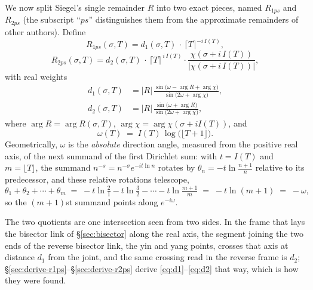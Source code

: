 \documentclass[11pt]{article}
\theoremstyle{definition}
\begin{document}
We now split Siegel's single remainder $R$ into two exact pieces, named
$R_{1ps}$ and $R_{2ps}$ (the subscript ``$ps$'' distinguishes them from the
approximate remainders of other authors). Define
\begin{equation}\label{eq:R1ps-def}
R_{1ps}(\sigma, T) = d_{1}(\sigma, T)\,\cdot\, \lceil T \rceil^{-i\,I(T)},
\end{equation}
\begin{equation}\label{eq:R2ps-def}
R_{2ps}(\sigma, T) = d_{2}(\sigma, T)\,\cdot\, \lceil T \rceil^{\,i\,I(T)}
\cdot \frac{\chi(\sigma + i\,I(T))}{|\chi(\sigma + i\,I(T))|},
\end{equation}
with real weights
\begin{align}
d_{1}(\sigma,T) &= |R|\,
\frac{\sin\!\bigl(\omega - \arg R + \arg\chi\bigr)}{\sin\!\bigl(2\omega + \arg\chi\bigr)},
\label{eq:d1}\\[4pt]
d_{2}(\sigma,T) &= |R|\,
\frac{\sin\!\bigl(\omega + \arg R\bigr)}{\sin\!\bigl(2\omega + \arg\chi\bigr)},
\label{eq:d2}
\end{align}
where $\arg R=\arg R(\sigma,T)$, $\arg\chi=\arg\chi(\sigma+iI(T))$, and
\begin{equation}
\omega(T) \;=\; I(T)\,\log\!\bigl(\lfloor T+1\rfloor\bigr).
\end{equation}
Geometrically, $\omega$ is the \emph{absolute} direction angle, measured from
the positive real axis, of the next summand of the first Dirichlet sum: with
$t=I(T)$ and $m=\lfloor T\rfloor$, the summand $n^{-s}=n^{-\sigma}e^{-it\ln n}$
rotates by $\theta_n=-t\ln\tfrac{n+1}{n}$ relative to its predecessor, and these
relative rotations telescope,
\begin{equation}\label{eq:omega-telescope}
\theta_1+\theta_2+\cdots+\theta_m
\;=\;
-t\ln\tfrac{2}{1}-t\ln\tfrac{3}{2}-\cdots-t\ln\tfrac{m+1}{m}
\;=\;
-t\ln(m+1)
\;=\;
-\omega,
\end{equation}
so the $(m+1)$st summand points along $e^{-i\omega}$.

The two quotients are one intersection seen from two sides. In the frame that
lays the bisector link of \S\ref{sec:bisector} along the real axis, the segment
joining the two ends of the reverse bisector link, the yin and yang points,
crosses that axis at distance $d_1$ from the joint, and the same crossing read in
the reverse frame is $d_2$; \S\ref{sec:derive-r1ps}--\S\ref{sec:derive-r2ps}
derive \eqref{eq:d1}--\eqref{eq:d2} that way, which is how they were found.
\end{document}

